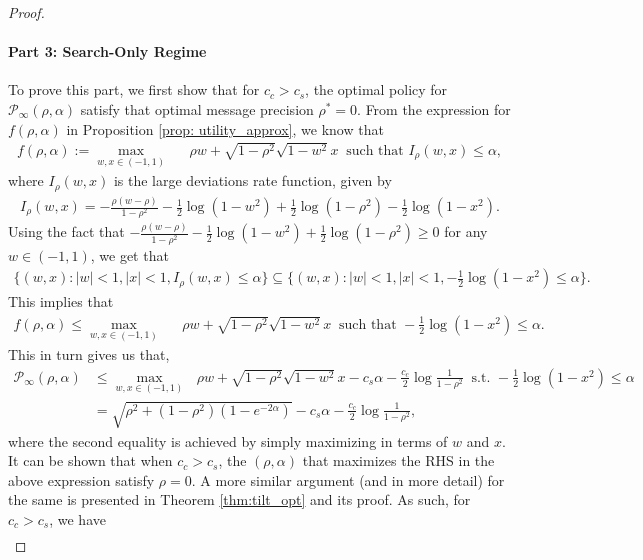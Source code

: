 \documentclass[10pt,a4paper]{amsart}
\begin{document}
\begin{proof}
\paragraph{Part 3: Search-Only Regime}
To prove this part, we first show that for $c_c > c_s$, the optimal policy for $\mathcal{P}_\infty(\rho,\alpha)$ satisfy that optimal message precision $\rho^* = 0$. From the expression for $f(\rho, \alpha)$ in Proposition \ref{prop: utility_approx}, we know that
\begin{align*}
    f(\rho,\alpha) := \max_{w, x \in (-1,1)} & \ \ \ \rho w + \sqrt{1-\rho^2} \sqrt{1-w^2} x \ \text{ such that } I_{\rho}(w,x) \leq \alpha,
\end{align*}
where $I_{\rho}(w,x)$ is the large deviations rate function, given by
\begin{align*}
    I_{\rho}(w,x) = -\frac{\rho(w-\rho)}{1-\rho^2} - \frac{1}{2} \log(1-w^2)+ \frac{1}{2} \log(1-\rho^2) -\frac{1}{2} \log(1-x^2).
\end{align*}
Using the fact that $-\frac{\rho(w-\rho)}{1-\rho^2} - \frac{1}{2} \log(1-w^2)+ \frac{1}{2} \log(1-\rho^2) \geq 0$ for any $w\in (-1,1)$, we get that
\begin{align*}
    \big\{ (w,x) : |w| < 1, |x|<1, I_{\rho}(w,x) \leq \alpha \big\} \subseteq \Big\{ (w,x) : |w| < 1, |x|<1, -\frac{1}{2} \log(1-x^2)  \leq \alpha \Big\}.
\end{align*}
This implies that
\begin{align*}
    f(\rho,\alpha) \leq \max_{w, x \in (-1,1)} & \ \ \ \rho w + \sqrt{1-\rho^2} \sqrt{1-w^2} x \ \text{ such that } -\frac{1}{2} \log(1-x^2)  \leq \alpha.
\end{align*}
This in turn gives us that,
\begin{align*}
    \mathcal{P}_\infty (\rho, \alpha) &\leq \max_{w, x \in (-1,1)} \ \ \ \rho w + \sqrt{1-\rho^2} \sqrt{1-w^2} x - c_s \alpha - \frac{c_c}{2}\log \frac{1}{1-\rho^2} \ \text{ s.t. } -\frac{1}{2} \log(1-x^2)  \leq \alpha\\
    &= \sqrt{\rho^2 + (1-\rho^2) (1-e^{-2\alpha})} - c_s \alpha - \frac{c_c}{2}\log \frac{1}{1-\rho^2},
\end{align*}
where the second equality is achieved by simply maximizing in terms of $w$ and $x$. It can be shown that when $c_c>c_s$, the $(\rho,\alpha)$ that maximizes the RHS in the above expression satisfy $\rho = 0$. A more similar argument (and in more detail) for the same is presented in Theorem \ref{thm:tilt_opt} and its proof. As such, for $c_c>c_s$, we have
\begin{align*}

\end{align*}
\end{proof}
\end{document}
